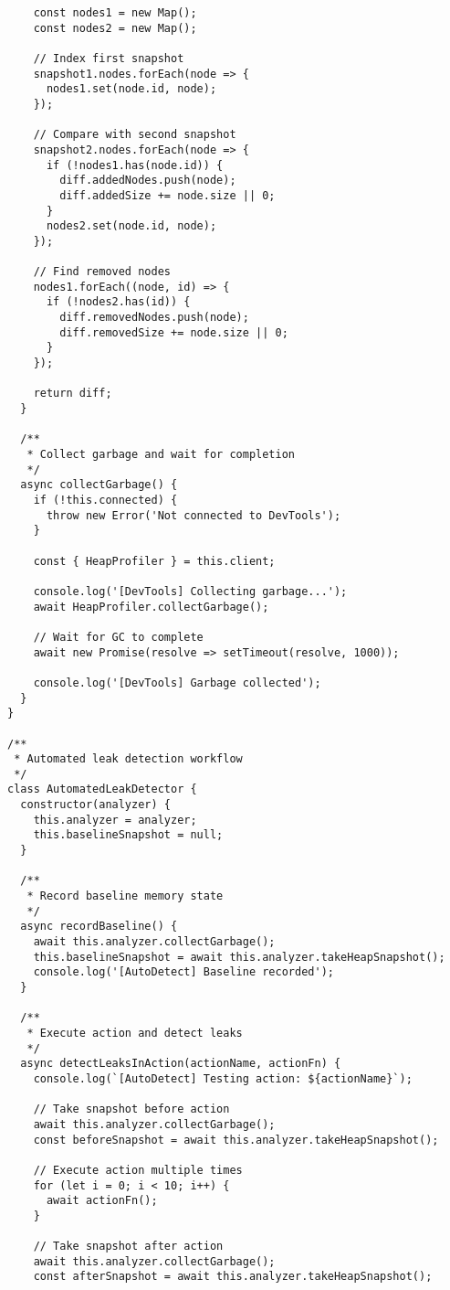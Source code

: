 \documentclass[11pt]{article}
\begin{document}
\begin{verbatim}
    const nodes1 = new Map();
    const nodes2 = new Map();
    
    // Index first snapshot
    snapshot1.nodes.forEach(node => {
      nodes1.set(node.id, node);
    });
    
    // Compare with second snapshot
    snapshot2.nodes.forEach(node => {
      if (!nodes1.has(node.id)) {
        diff.addedNodes.push(node);
        diff.addedSize += node.size || 0;
      }
      nodes2.set(node.id, node);
    });
    
    // Find removed nodes
    nodes1.forEach((node, id) => {
      if (!nodes2.has(id)) {
        diff.removedNodes.push(node);
        diff.removedSize += node.size || 0;
      }
    });
    
    return diff;
  }
  
  /**
   * Collect garbage and wait for completion
   */
  async collectGarbage() {
    if (!this.connected) {
      throw new Error('Not connected to DevTools');
    }
    
    const { HeapProfiler } = this.client;
    
    console.log('[DevTools] Collecting garbage...');
    await HeapProfiler.collectGarbage();
    
    // Wait for GC to complete
    await new Promise(resolve => setTimeout(resolve, 1000));
    
    console.log('[DevTools] Garbage collected');
  }
}

/**
 * Automated leak detection workflow
 */
class AutomatedLeakDetector {
  constructor(analyzer) {
    this.analyzer = analyzer;
    this.baselineSnapshot = null;
  }
  
  /**
   * Record baseline memory state
   */
  async recordBaseline() {
    await this.analyzer.collectGarbage();
    this.baselineSnapshot = await this.analyzer.takeHeapSnapshot();
    console.log('[AutoDetect] Baseline recorded');
  }
  
  /**
   * Execute action and detect leaks
   */
  async detectLeaksInAction(actionName, actionFn) {
    console.log(`[AutoDetect] Testing action: ${actionName}`);
    
    // Take snapshot before action
    await this.analyzer.collectGarbage();
    const beforeSnapshot = await this.analyzer.takeHeapSnapshot();
    
    // Execute action multiple times
    for (let i = 0; i < 10; i++) {
      await actionFn();
    }
    
    // Take snapshot after action
    await this.analyzer.collectGarbage();
    const afterSnapshot = await this.analyzer.takeHeapSnapshot();
    

\end{verbatim}
\end{document}
